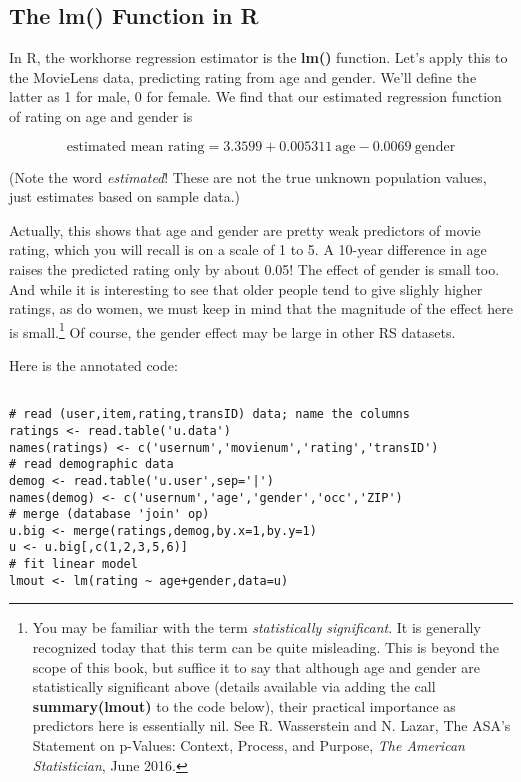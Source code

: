 \subsection{The lm() Function in R}

In R, the workhorse regression estimator is the \textbf{lm()} function.
Let's apply this to the MovieLens data, predicting rating from age and
gender.  We'll define the latter as 1 for male, 0 for female.  We find
that our estimated regression function of rating on age and gender is

\begin{equation}
\textrm{estimated mean rating} = 3.3599 + 0.005311 ~ \textrm{age} 
- 0.0069 ~ \textrm{gender}
\end{equation}

(Note the word \textit{estimated}! These are not the true unknown
population values, just estimates based on sample data.)

Actually, this shows that age and gender are pretty weak predictors of
movie rating, which you will recall is on a scale of 1 to 5.  A 10-year
difference in age raises the predicted rating only by about 0.05!  The
effect of gender is small too.  And while it is interesting to see that
older people tend to give slighly higher ratings, as do women, we must
keep in mind that the magnitude of the effect here is
small.\footnote{You may be familiar with the term \textit{statistically
significant}.  It is generally recognized today that this term can be
quite misleading.  This is beyond the scope of this book, but suffice it
to say that although age and gender are statistically significant above
(details available via adding the call \textbf{summary(lmout)} to the
code below), their practical importance as predictors here is
essentially nil.  See R. Wasserstein and N. Lazar, The ASA's Statement
on p-Values: Context, Process, and Purpose, \textit{The American
Statistician}, June 2016.}  Of course, the gender effect may be large in
other RS datasets.

Here is the annotated code:

\begin{lstlisting}

# read (user,item,rating,transID) data; name the columns
ratings <- read.table('u.data') 
names(ratings) <- c('usernum','movienum','rating','transID') 
# read demographic data
demog <- read.table('u.user',sep='|') 
names(demog) <- c('usernum','age','gender','occ','ZIP') 
# merge (database 'join' op)
u.big <- merge(ratings,demog,by.x=1,by.y=1) 
u <- u.big[,c(1,2,3,5,6)] 
# fit linear model
lmout <- lm(rating ~ age+gender,data=u) 

\end{lstlisting}

